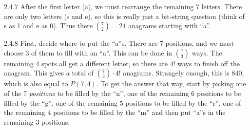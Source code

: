 \documentclass[11pt,]{book}
\theoremstyle{ptxplainnotitle}
\theoremstyle{ptxplaintitle}
\theoremstyle{ptxdefinitionnotitle}
\theoremstyle{ptxdefinitiontitle}
\theoremstyle{ptxdefinitionnotitle}
\theoremstyle{ptxdefinitiontitle}
\theoremstyle{ptxdefinitionnotitle}
\theoremstyle{ptxdefinitiontitle}
\theoremstyle{ptxdefinitiontitlenonumber}
\theoremstyle{ptxdefinitiontitlenonumber}
\numberwithin{equation}{chapter}
\begin{document}
\begin{divisionexercise}{2.4.7}
\textbf{}\hypertarget{p-1595}{}%
After the first letter (a), we must rearrange the remaining 7 letters. There are only two letters (s and e), so this is really just a bit-string question (think of s as 1 and e as 0). Thus there \({7 \choose 2} = 21\) anagrams starting with ``a''.%
\end{divisionexercise}%
\begin{divisionexercise}{2.4.8}
\textbf{}\hypertarget{p-1601}{}%
First, decide where to put the ``a''s. There are 7 positions, and we must choose 3 of them to fill with an ``a''. This can be done in \({7 \choose 3}\) ways. The remaining 4 spots all get a different letter, so there are \(4!\) ways to finish off the anagram. This gives a total of \({7 \choose 3}\cdot 4!\) anagrams. Strangely enough, this is 840, which is also equal to \(P(7,4)\text{.}\) To get the answer that way, start by picking one of the 7 \emph{positions} to be filled by the ``n'', one of the remaining 6 positions to be filled by the ``g'', one of the remaining 5 positions to be filled by the ``r'', one of the remaining 4 positions to be filled by the ``m'' and then put ``a''s in the remaining 3 positions.%
\end{divisionexercise}%
\end{document}
